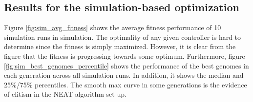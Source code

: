 \begin{table}[ht]
\caption{Evaluations taken place in simulation, reality or both.}
\label{tab:summary_experiments}
\end{table}

\subsection{Results for the simulation-based optimization}

Figure \ref{fig:sim_avg_fitness} shows the average fitness performance of 10 simulation runs in simulation. The optimality of any given controller is hard to determine since the fitness is simply maximized. However, it is clear from the figure that the fitness is progressing towards some optimum. Furthermore, figure \ref{fig:sim_best_genomes_percentile} shows the performance of the best genomes in each generation across all simulation runs. In addition, it shows the median and 25\%/75\% percentiles. The smooth max curve in some generations is the evidence of elitism in the NEAT algorithm set up. 

